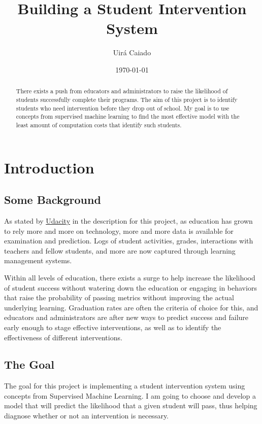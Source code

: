 \documentclass[a4paper]{article}
\title{Building a Student Intervention System}
\author{Uirá Caiado}
\date{\today}
\begin{document}
\maketitle

\begin{abstract}
There exists a push from educators and administrators to raise the likelihood of students successfully complete their programs. The aim of this project is to identify students who need intervention before they drop out of school. My goal is to use concepts from supervised machine learning to find the most effective model with the least amount of computation costs that identify such students.
\end{abstract}

\section{Introduction}
\label{sec:introduction}

\subsection{Some Background}
As stated by \href{https://www.udacity.com/course/viewer#!/c-nd009/l-5446988865/m-5446493941}{Udacity} in the description for this project, as education has grown to rely more and more on technology, more and more data is available for examination and prediction. Logs of student activities, grades, interactions with teachers and fellow students, and more are now captured through learning management systems.

Within all levels of education, there exists a surge to help increase the likelihood of student success without watering down the education or engaging in behaviors that raise the probability of passing metrics without improving the actual underlying learning. Graduation rates are often the criteria of choice for this, and educators and administrators are after new ways to predict success and failure early enough to stage effective interventions, as well as to identify the effectiveness of different interventions.

\subsection{The Goal}
The goal for this project is implementing a student intervention system using concepts from Supervised Machine Learning. I am going to choose and develop a model that will predict the likelihood that a given student will pass, thus helping diagnose whether or not an intervention is necessary.
\end{document}
